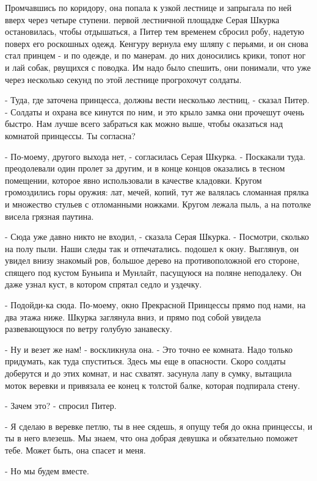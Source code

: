 Промчавшись по коридору, она попала к узкой лестнице и запрыгала по 
ней вверх через четыре ступени.
 первой лестничной площадке Серая Шкурка остановилась, чтобы 
отдышаться, а Питер тем временем сбросил робу, надетую поверх его 
роскошных одежд. Кенгуру вернула ему шляпу с перьями, и он снова стал 
принцем - и по одежде, и по манерам.
 до них доносились крики, топот ног и лай собак, рвущихся с 
поводка. Им надо было спешить, они понимали, что уже через несколько 
секунд по этой лестнице прогрохочут солдаты.
\par- Туда, где заточена принцесса, должны вести несколько лестниц, - 
сказал Питер. - Солдаты и охрана все кинутся по ним, и это крыло замка 
они прочешут очень быстро. Нам лучше всего забраться как можно выше, 
чтобы оказаться над комнатой принцессы. Ты согласна?
\par- По-моему, другого выхода нет, - согласилась Серая Шкурка. - 
Поскакали туда.
 преодолевали один пролет за другим, и в конце концов оказались 
в тесном помещении, которое явно использовали в качестве кладовки. 
Кругом громоздились горы оружия: лат, мечей, копий, тут же валялась 
сломанная прялка и множество стульев с отломанными ножками. Кругом 
лежала пыль, а на потолке висела грязная паутина.
\par- Сюда уже давно никто не входил, - сказала Серая Шкурка. - 
Посмотри, сколько на полу пыли. Наши следы так и отпечатались.
 подошел к окну. Выглянув, он увидел внизу знакомый ров, 
большое дерево на противоположной его стороне, спящего под кустом 
Буньипа и Мунлайт, пасущуюся на поляне неподалеку. Он даже узнал куст, 
в котором спрятал седло и уздечку.
\par- Подойди-ка сюда. По-моему, окно Прекрасной Принцессы прямо под 
нами, на два этажа ниже.
 Шкурка заглянула вниз, и прямо под собой увидела 
развевающуюся по ветру голубую занавеску.
\par- Ну и везет же нам! - воскликнула она. - Это точно ее комната. 
Надо только придумать, как туда спуститься. Здесь мы еще в опасности. 
Скоро солдаты доберутся и до этих комнат, и нас схватят.
 засунула лапу в сумку, вытащила моток веревки и привязала ее 
конец к толстой балке, которая подпирала стену.
\par- Зачем это? - спросил Питер.
\par- Я сделаю в веревке петлю, ты в нее сядешь, я опущу тебя до окна 
принцессы, и ты в него влезешь. Мы знаем, что она добрая девушка и 
обязательно поможет тебе. Может быть, она спасет и меня.
\par- Но мы будем вместе.
